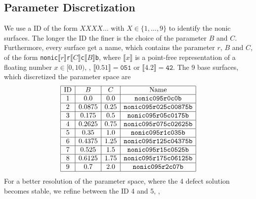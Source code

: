 \documentclass[a4paper,11pt]{scrartcl}
\newcommand{\pstretch}{C}
\newcommand{\pprop}{r}
\newcommand{\ppress}{B}
\begin{document}
\subsection{Parameter Discretization}
We use a ID of the form \( XXXX\ldots \) with \( X\in\{1,\ldots,9\} \) to identify the nonic surfaces.
The longer the ID the finer is the choice of the parameter \( \ppress \) and \( \pstretch \).
Furthermore, every surface get a name, which contains the parameter \( \pprop \), \( \ppress \)
and \( \pstretch \), of the form 
\texttt{nonic\( \llbracket\pprop\rrbracket \)r\( \llbracket\pstretch\rrbracket \)c\( \llbracket\ppress\rrbracket \)b},
where \( \llbracket x\rrbracket \) is a point-free representation of a floating number \( x\in[0,10) \),
\eg, \( \llbracket 0.51 \rrbracket = \texttt{051} \) or \( \llbracket 4.2 \rrbracket = \texttt{42} \).
The 9 base surfaces, which discretized the parameter space are
\begin{align}
  \begin{array}{|c|c|c|c|}
    \hline
    \text{ID} & \ppress & \pstretch & \text{Name}\\\hline
1 & 0.0 & 0.0 & \texttt{nonic095r0c0b} \\\hline
2 & 0.0875 & 0.25 & \texttt{nonic095r025c00875b} \\\hline
3 & 0.175 & 0.5 & \texttt{nonic095r05c0175b} \\\hline
4 & 0.2625 & 0.75 & \texttt{nonic095r075c02625b} \\\hline
5 & 0.35 & 1.0 & \texttt{nonic095r1c035b} \\\hline
6 & 0.4375 & 1.25 & \texttt{nonic095r125c04375b} \\\hline
7 & 0.525 & 1.5 & \texttt{nonic095r15c0525b} \\\hline
8 & 0.6125 & 1.75 & \texttt{nonic095r175c06125b} \\\hline
9 & 0.7 & 2.0 & \texttt{nonic095r2c07b} \\\hline    
  \end{array}
\end{align}
For a better resolution of the parameter space, where the 4 defect solution becomes stable, we refine between the ID 4 and 5,
\ie,
\end{document}
